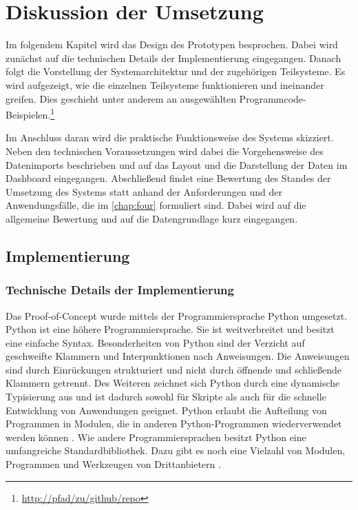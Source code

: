 \chapter{Diskussion der Umsetzung}
\label{chap:five}
Im folgendem Kapitel wird das Design des Prototypen besprochen. Dabei wird zunächst auf die technischen Details der
Implementierung eingegangen. Danach folgt die Vorstellung der Systemarchitektur und der zugehörigen Teilsysteme.
Es wird aufgezeigt, wie die einzelnen Teilsysteme funktionieren und ineinander greifen. Dies geschieht
unter anderem an ausgewählten Programmcode-Beispielen.\footnote{\url{http://pfad/zu/github/repo}}

Im Anschluss daran wird die praktische Funktionsweise des Systems skizziert. Neben den technischen Voraussetzungen wird dabei 
die Vorgehensweise des Datenimports beschrieben und auf das Layout und die Darstellung der Daten im Dashboard eingegangen. 
Abschließend findet eine Bewertung des Standes der Umsetzung des Systems statt anhand der Anforderungen und der Anwendungsfälle, die im \autoref{chap:four} formuliert sind.
Dabei wird auf die allgemeine Bewertung und auf die Datengrundlage kurz eingegangen.


\section{Implementierung}
    
    \subsection{Technische Details der Implementierung}
    Das Proof-of-Concept wurde mittels der Programmiersprache Python umgesetzt.
    Python ist eine höhere Programmiersprache. Sie ist weitverbreitet \cite[vgl.][]{loukides_where_2021} und besitzt
    eine einfache Syntax. Besonderheiten von Python sind der Verzicht auf geschweifte Klammern und Interpunktionen nach Anweisungen.
    Die Anweisungen sind durch Einrückungen strukturiert und nicht durch öffnende und schließende Klammern
    getrennt. Des Weiteren zeichnet sich Python durch eine dynamische Typisierung aus und ist dadurch sowohl für Skripte als auch 
    für die schnelle Entwicklung von Anwendungen geeignet. Python erlaubt die Aufteilung von Programmen in Modulen, die in anderen Python-Programmen wiederverwendet werden können
    \cite[vgl.][]{python_6_2021}.
    Wie andere Programmiersprachen besitzt Python eine umfangreiche Standardbibliothek. 
    Dazu gibt es noch eine Vielzahl von Modulen, Programmen und Werkzeugen von Drittanbietern \cite[vgl.][]{python_pypi_2021}.
    
